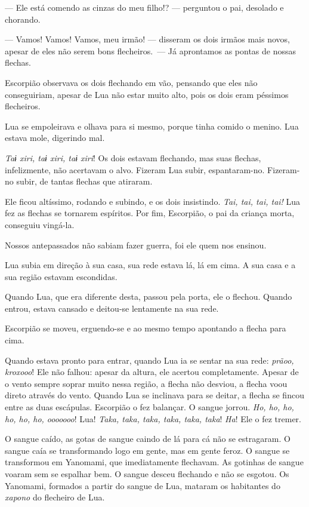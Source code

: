 --- Ele está comendo as cinzas do meu filho!? --- perguntou o pai, desolado e
chorando. 

--- Vamos! Vamos! Vamos, meu irmão! --- disseram os dois irmãos mais
novos, apesar de eles não serem bons flecheiros.~--- Já aprontamos as pontas de nossas flechas. 

Escorpião observava os dois flechando em vão, pensando que eles não
conseguiriam, apesar de Lua não estar muito alto, pois os dois eram
péssimos flecheiros. 

Lua se empoleirava e olhava para si mesmo, porque tinha comido o
menino. Lua estava mole, digerindo mal. 

\textit{Taɨ xiri, taɨ xiri, taɨ xiri}! Os dois estavam flechando, mas suas
flechas, infelizmente, não acertavam o alvo. Fizeram Lua subir,
espantaram-no. Fizeram-no subir, de tantas flechas que atiraram. 

Ele ficou altíssimo, rodando e subindo, e os dois insistindo. \textit{Tai,
tai, tai, tai!} Lua fez as flechas se tornarem espíritos. Por fim,
Escorpião, o pai da criança morta, conseguiu vingá-la. 

Nossos antepassados não sabiam fazer guerra, foi ele quem nos ensinou. 

Lua subia em direção à sua casa, sua rede estava lá, lá em cima. A sua
casa e a sua região estavam escondidas. 

Quando Lua, que era diferente desta, passou pela porta, ele o flechou.
 Quando entrou, estava cansado e deitou-se lentamente na sua rede. 

Escorpião se moveu, erguendo-se e ao mesmo tempo apontando a flecha
 para cima. 

Quando estava pronto para entrar, quando Lua ia se sentar na sua
rede: \textit{prãoo, kroxooo}! Ele não falhou: apesar da altura, ele
acertou completamente. Apesar de o vento sempre soprar muito nessa região,
a flecha não desviou, a flecha voou direto através do vento. Quando Lua se inclinava para se deitar, a flecha se fincou entre as duas
escápulas. Escorpião o fez balançar. O sangue jorrou. \textit{Ho, ho, ho,
ho, ho, ho, ooooooo}! Lua! \textit{Taka, taka, taka, taka, taka,
taka}! \textit{Ha}! Ele o fez tremer. 

O sangue caído, as gotas de sangue caindo de lá para cá não se
estragaram. O sangue caía se transformando logo em gente, mas em
gente feroz. O sangue se transformou em Yanomami, que imediatamente
flechavam. As gotinhas de sangue voaram sem se espalhar bem. O sangue
desceu flechando e não se esgotou. Os Yanomami, formados a partir
do sangue de Lua, mataram os habitantes do \textit{xapono} do flecheiro de Lua. 

